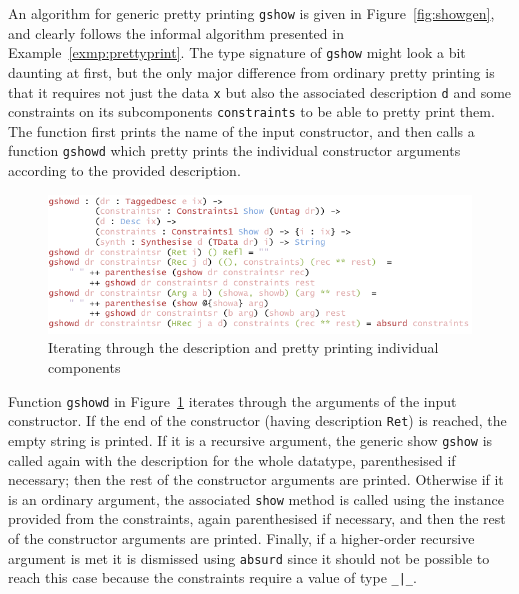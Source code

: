 \documentclass{ituthesis}
\newcommand{\ttconstructor}[1]{\textcolor{constructor-color}{\texttt{#1}}}
\newcommand{\tttype}[1]{\textcolor{type-color}{\texttt{#1}}}
\newcommand{\ttdec}[1]{\textcolor{declared-var-color}{\texttt{#1}}}
\newcommand{\ttvar}[1]{\textcolor{local-var-color}{\texttt{#1}}}
\theoremstyle{break}
\begin{document}
An algorithm for generic pretty printing \ttdec{gshow} is given in Figure~\ref{fig:showgen}, and clearly follows the informal algorithm presented in Example~\ref{exmp:prettyprint}.
The type signature of \ttdec{gshow} might look a bit daunting at first, but the only major difference from ordinary pretty printing is that it requires not just the data \ttvar{x} but also the associated description \ttvar{d}
and some constraints on its subcomponents \ttvar{constraints} to be able to pretty print them.
The function first prints the name of the input constructor, and then calls a function \ttdec{gshowd} which pretty prints the individual constructor arguments according to the provided description.

\begin{figure}[ht]
\begin{center}
    \includegraphics[scale=0.5]{Figures/GenericShowDesc.png}
\end{center}
\caption{Iterating through the description and pretty printing individual components}
\label{fig:showgendesc}
\end{figure}

Function \ttdec{gshowd} in Figure~\ref{fig:showgendesc} iterates through the arguments of the input constructor.
If the end of the constructor (having description \ttconstructor{Ret}) is reached, the empty string is printed.
If it is a recursive argument, the generic show \ttdec{gshow} is called again with the description for the whole datatype, parenthesised if necessary; then the rest of the constructor arguments are printed.
Otherwise if it is an ordinary argument, the associated \ttdec{show} method is called using the instance provided from the constraints, again parenthesised if necessary, and then the rest of the constructor arguments are printed.
Finally, if a higher-order recursive argument is met it is dismissed using \ttdec{absurd} since it should not be possible to reach this case because the constraints require a value of type \tttype{\_|\_}.
\end{document}
